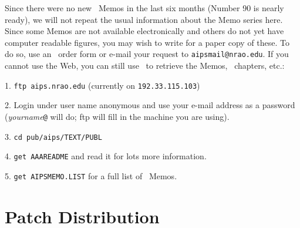 Since there were no new \AIPS\ Memos in the last six months (Number 90
is nearly ready), we will not repeat the usual information about the
Memo series here.  Since some Memos are not available electronically
and others do not yet have computer readable figures, you may wish to
write for a paper copy of these.  To do so, use an \AIPS\ order form
or e-mail your request to {\tt aipsmail@nrao.edu}.  If you cannot use
the Web, you can still use \ftp\ to retrieve the Memos, \Cookbook\
chapters, etc.:
\begin{description}
\vspace{-10pt}
\item{ 1.} {\tt ftp aips.nrao.edu}  (currently on {\tt 192.33.115.103})
\item{ 2.} Login under user name anonymous and use your e-mail address
           as a password ({\it yourname}{\tt @} will do; ftp will
           fill in the machine you are using).
\item{ 3.} {\tt cd pub/aips/TEXT/PUBL}
\item{ 4.} {\tt get AAAREADME} and read it for lots more information.
\item{ 5.} {\tt get AIPSMEMO.LIST} for a full list of \AIPS\ Memos.
\end{description}

\section{Patch Distribution}

